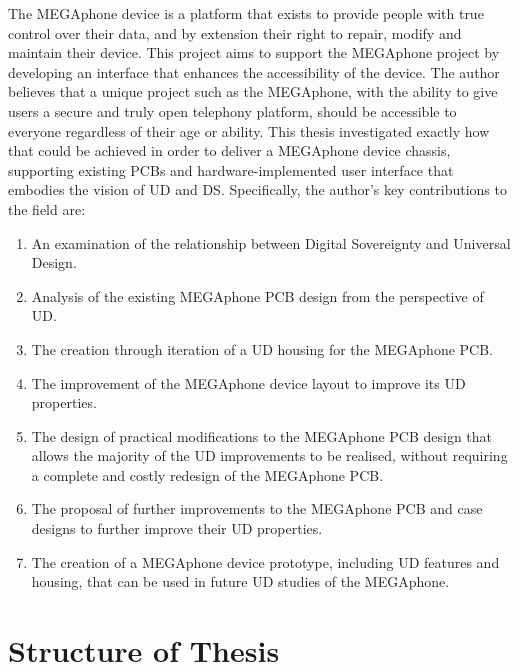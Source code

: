 The MEGAphone device is a platform that exists to provide people with true control over their data, and by extension their right to repair, modify and maintain their device.
This project aims to support the MEGAphone project by developing an interface that enhances the accessibility of the device.
The author believes that a unique project such as the MEGAphone, with the ability to give users a secure and truly open telephony platform, should be accessible to everyone regardless of their age or ability.
This thesis investigated exactly how that could be achieved in order to deliver a MEGAphone device chassis, supporting existing PCBs and hardware-implemented user interface that embodies the vision of UD and DS.\vspace{5mm} %
\newline
Specifically, the author's key contributions to the field are:
\begin{enumerate}
    \item An examination of the relationship between Digital Sovereignty and Universal Design.
    \item Analysis of the existing MEGAphone PCB design from the perspective of UD.
    \item The creation through iteration of a UD housing for the MEGAphone PCB.
    \item The improvement of the MEGAphone device layout to improve its UD properties.
    \item The design of practical modifications to the MEGAphone PCB design that allows the majority of the UD improvements to be realised, without requiring a complete and costly redesign of the MEGAphone PCB.
    \item The proposal of further improvements to the MEGAphone PCB and case designs to further improve their UD properties.
    \item The creation of a MEGAphone device prototype, including UD features and housing, that can be used in future UD studies of the MEGAphone.
\end{enumerate}

\section{Structure of Thesis}

